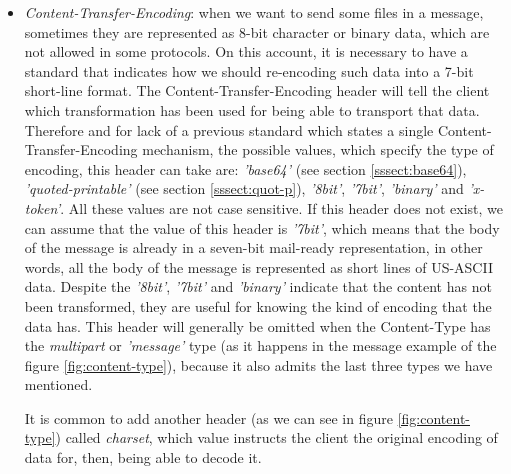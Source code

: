 \begin{itemize}
	\item\textit{Content-Transfer-Encoding}: when we want to send some files in a message, sometimes they are represented as 8-bit character or binary data, which are not allowed in some protocols. On this account, it is necessary to have a standard that indicates how we should re-encoding such data into a 7-bit short-line format. The Content-Transfer-Encoding header \citep[section 5]{rfc1341} will tell the client which transformation has been used for being able to transport that data. Therefore and for lack of a previous standard which states a single Content-Transfer-Encoding mechanism, the possible values, which specify the type of encoding, this header can take are: \textit{'base64'} (see section \ref{sssect:base64}), \textit{'quoted-printable'} (see section \ref{sssect:quot-p}), \textit{'8bit'}, \textit{'7bit'}, \textit{'binary'} and \textit{'x-token'}. All these values are not case sensitive. If this header does not exist, we can assume that the value of this header is \textit{'7bit'}, which means that the body of the message is already in a seven-bit mail-ready representation, in other words, all the body of the message is represented as short lines of US-ASCII data. Despite the \textit{'8bit'}, \textit{'7bit'} and \textit{'binary'} indicate that the content has not been transformed, they are useful for knowing the kind of encoding that the data has. This header will generally be omitted when the Content-Type has the \textit{multipart} or \textit{'message'} type (as it happens in the message example of the figure \ref{fig:content-type}), because it also admits the last three types we have mentioned.
	
	It is common to add another header (as we can see in figure \ref{fig:content-type}) called \textit{charset}, which value instructs the client the original encoding of data for, then, being able to decode it.
\end{itemize}

